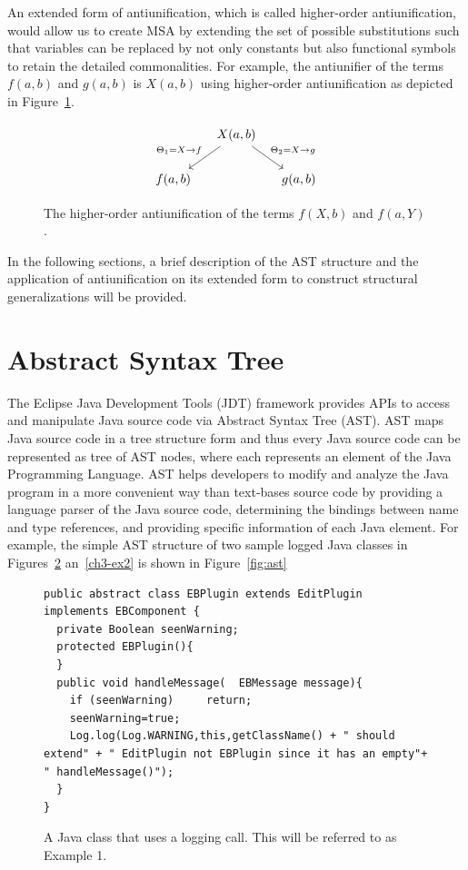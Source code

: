 An extended form of antiunification, which is called higher-order antiunification, would allow us to create MSA by extending the set of possible substitutions such that variables can be replaced by not only constants but also functional symbols to retain the detailed commonalities. For example, the antiunifier of the terms $f(a,b)$ and $g(a,b)$ is $X(a,b)$ using higher-order antiunification as depicted in Figure~\ref{fig:higher-anti-uni}.
\begin{figure} [H]
\[
\begin{tikzcd}[column sep=small]
&
  X(a,b)
  \arrow{dr}{\Theta_2 = X \rightarrow g}
  \arrow[->,swap]{dl}{\Theta_1 = X \rightarrow f} %
\\
f(a,b)
&&
g(a,b)
\end{tikzcd}
\]
  \caption{The higher-order antiunification of the terms $f(X,b)$ and $f(a,Y)$.}
  \label{fig:higher-anti-uni}
\end{figure}

In the following sections, a brief description of the AST structure and the application of antiunification on its extended form to construct structural generalizations will be provided.

\section{Abstract Syntax Tree}   \label{AST}
The Eclipse Java Development Tools (JDT) framework provides APIs to access and manipulate Java source code via Abstract Syntax Tree (AST). AST maps Java source code in a tree structure form and thus every Java source code can be represented as tree of AST nodes, where each represents an element of the Java Programming Language. AST helps developers to modify and analyze the Java program in a more convenient way than text-bases source code by providing a language parser of the Java source code, determining the bindings between name and type references, and providing specific information of each Java element. For example, the simple AST structure of two sample logged Java classes in Figures~\ref{ch3-ex1} an~\ref{ch3-ex2} is shown in Figure~\ref{fig:ast}


\begin{figure}[H]
\def\baselinestretch{1}
\begin{lstlisting}
public abstract class EBPlugin extends EditPlugin implements EBComponent {
  private Boolean seenWarning;
  protected EBPlugin(){
  }
  public void handleMessage(  EBMessage message){
    if (seenWarning)     return;
    seenWarning=true;
    Log.log(Log.WARNING,this,getClassName() + " should extend" + " EditPlugin not EBPlugin since it has an empty"+ " handleMessage()");
  }
}
\end{lstlisting}
\caption{A Java class that uses a logging call. This will be referred to as Example 1.\label{ch3-ex1}}
\end{figure}


